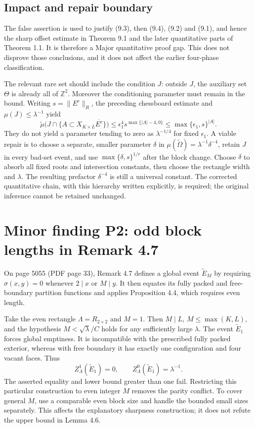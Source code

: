 \documentclass[10pt]{article}
\begin{document}
\subsection*{Impact and repair boundary}
The false assertion is used to justify (9.3), then (9.4), (9.2) and (9.1), and hence the sharp offset estimate in Theorem 9.1 and the later quantitative parts of Theorem 1.1. It is therefore a Major quantitative proof gap. This does not disprove those conclusions, and it does not affect the earlier four-phase classification.\par
The relevant rare set should include the condition \(J\): outside \(J\), the auxiliary set \(\Theta\) is already all of \(\mathbb Z^2\). Moreover the conditioning parameter must remain in the bound. Writing \(s=\|E^c\|_R\), the preceding chessboard estimate and \(\mu(J)\leq\lambda^{-1}\) yield \[\widetilde\mu\bigl(J\cap\{A\subset
 X_{K\times L}\overline{E^c}\}\bigr)
 \leq \epsilon_1^4 s^{\max\{|A|-4,0\}}
 \leq \max\{\epsilon_1,s\}^{|A|}.\] They do not yield a parameter tending to zero as \(\lambda^{-1/4}\) for fixed \(\epsilon_1\). A viable repair is to choose a separate, smaller parameter \(\delta\) in \(\mu(\widetilde\Omega)=\lambda^{-1}\delta^{-4}\), retain \(J\) in every bad-set event, and use \(\max\{\delta,s\}^{1/r}\) after the block change. Choose \(\delta\) to absorb all fixed roots and intersection constants, then choose the rectangle width and \(\lambda\). The resulting prefactor \(\delta^{-4}\) is still a universal constant. The corrected quantitative chain, with this hierarchy written explicitly, is required; the original inference cannot be retained unchanged.\par
\section*{Minor finding P2: odd block lengths in Remark 4.7}
On page 5055 (PDF page 33), Remark 4.7 defines a global event \(\widetilde E_M\) by requiring \(\sigma(x,y)=0\) whenever \(2\mid x\) or \(M\mid y\). It then equates its fully packed and free-boundary partition functions and applies Proposition 4.4, which requires even length.\par
Take the even rectangle \(\Lambda=R_{2\times2}\) and \(M=1\). Then \(M\mid L\), \(M\leq\max(K,L)\), and the hypothesis \(M<\sqrt\lambda/C\) holds for any sufficiently large \(\lambda\). The event \(\widetilde E_1\) forces global emptiness. It is incompatible with the prescribed fully packed exterior, whereas with free boundary it has exactly one configuration and four vacant faces. Thus \[Z^1_\Lambda(\widetilde E_1)=0,\qquad
 Z^0_\Lambda(\widetilde E_1)=\lambda^{-1}.\] The asserted equality and lower bound greater than one fail. Restricting this particular construction to even integer \(M\) removes the parity conflict. To cover general \(M\), use a comparable even block size and handle the bounded small sizes separately. This affects the explanatory sharpness construction; it does not refute the upper bound in Lemma 4.6.\par
\end{document}
